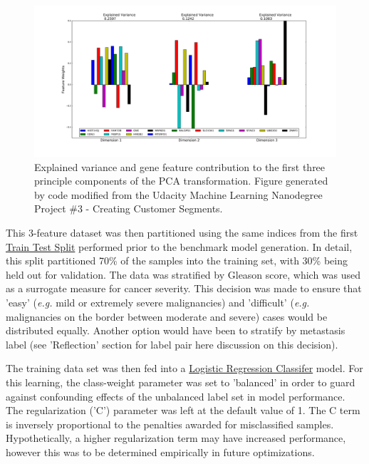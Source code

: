\documentclass[final]{article}
\begin{document}
\begin{figure}[h]
  \centering
  \includegraphics[width=\textwidth]{pcaEV}
  \caption{\label{fig:pcaEV}Explained variance and gene feature contribution to the first three principle
  components of the PCA transformation. Figure generated by code modified from
  the Udacity Machine Learning Nanodegree Project \#3 - Creating Customer Segments.}
\end{figure}

This 3-feature dataset was then partitioned using the same indices from the
first
\href{http://scikit-learn.org/stable/modules/generated/sklearn.cross_validation.train_test_split.html}{Train
Test Split} performed prior to the benchmark model generation.  In detail, this
split partitioned 70\% of the samples into the training set, with 30\% being
held out for validation.  The data was stratified by Gleason score, which was
used as a surrogate measure for cancer severity. This decision was made to
ensure that 'easy' (\textit{e.g.} mild or extremely severe malignancies) and
'difficult' (\textit{e.g.} malignancies on the border between moderate and
severe) cases would be distributed equally.  Another option would have been to
stratify by  metastasis label (see 'Reflection' section for  %
label pair here discussion on this decision).

The training data set was then fed into a
\href{http://scikit-learn.org/stable/modules/generated/sklearn.linear_model.LogisticRegression.html}{Logistic
Regression Classifer} model.  For this learning, the class-weight parameter was
set to 'balanced' in order to guard against confounding effects of the
unbalanced label set in model performance.  The regularization ('C') parameter
was left at the default value of 1.  The C term is inversely proportional to the
penalties awarded for misclassified samples. Hypothetically, a higher
regularization term may have increased performance, however this was to be
determined empirically in future optimizations.
\end{document}
